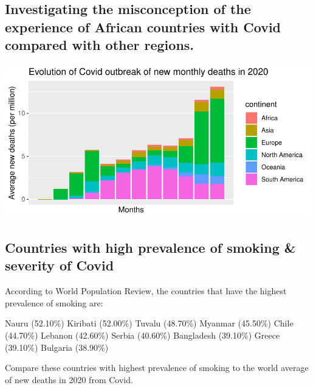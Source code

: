 \documentclass[11pt,preprint, authoryear]{elsarticle}
\let\origfigure\figure
\let\endorigfigure\endfigure
\renewenvironment{figure}[1][2] {
    \expandafter\origfigure\expandafter[H]
} {
    \endorigfigure
}
\numberwithin{equation}{section}
\numberwithin{figure}{section}
\numberwithin{table}{section}
\begin{document}
\hypertarget{investigating-the-misconception-of-the-experience-of-african-countries-with-covid-compared-with-other-regions.}{%
\subsection{Investigating the misconception of the experience of African
countries with Covid compared with other
regions.}\label{investigating-the-misconception-of-the-experience-of-african-countries-with-covid-compared-with-other-regions.}}

\begin{figure}[H]

{\centering \includegraphics{Question1_files/figure-latex/Figure1-1} 

}

\caption{Caption Here \label{Figure1}}\label{fig:Figure1}
\end{figure}

\hypertarget{countries-with-high-prevalence-of-smoking-severity-of-covid}{%
\subsection{Countries with high prevalence of smoking \& severity of
Covid}\label{countries-with-high-prevalence-of-smoking-severity-of-covid}}

According to World Population Review, the countries that have the
highest prevalence of smoking are:

Nauru (52.10\%) Kiribati (52.00\%) Tuvalu (48.70\%) Myanmar (45.50\%)
Chile (44.70\%) Lebanon (42.60\%) Serbia (40.60\%) Bangladesh (39.10\%)
Greece (39.10\%) Bulgaria (38.90\%)

Compare these countries with highest prevalence of smoking to the world
average of new deaths in 2020 from Covid.
\end{document}
